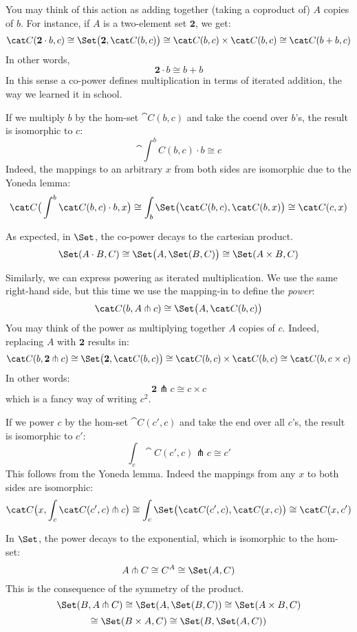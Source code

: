 \documentclass[DaoFP]{subfiles}
\begin{document}
You may think of this action as adding together (taking a coproduct of) $A$ copies of $b$. For instance, if $A$ is a two-element set $\mathbf 2$, we get:
\[ \cat C (\mathbf 2 \cdot b, c) \cong \Set \big( \mathbf 2, \cat C (b, c)\big) \cong \cat C(b, c) \times \cat C(b, c) \cong \cat C(b + b, c) \]
In other words, 
\[ \mathbf 2 \cdot b \cong b + b \]
In this sense a co-power defines multiplication in terms of iterated addition, the way we learned it in school. 

If we multiply $b$ by the hom-set $\cat C (b, c)$ and take the coend over $b$'s, the result is isomorphic to $c$:
\[ \cat \int^b C(b, c) \cdot b \cong c \]
Indeed, the mappings to an arbitrary $x$ from both sides are isomorphic due to the Yoneda lemma:
\[ \cat C \big( \int^b \cat C(b, c) \cdot b, x\big) \cong \int_b \Set \big( \cat C(b, c), \cat C (b, x)\big) \cong \cat C (c, x)\]



As expected, in $\Set$, the co-power decays to the cartesian product.
\[ \Set (A \cdot B, C) \cong \Set \big( A, \Set(B, C)\big) \cong \Set (A \times B, C) \]

Similarly, we can express powering as iterated multiplication. We use the same right-hand side, but this time we use the mapping-in to define the \emph{power}:
\[ \cat C (b, A \pitchfork c) \cong \Set  \big(A, \cat C(b, c)\big) \]
You may think of the power as multiplying together $A$ copies of $c$. Indeed, replacing $A$ with $\mathbf 2$ results in:
\[ \cat C (b, \mathbf 2 \pitchfork c) \cong \Set  \big(\mathbf 2, \cat C(b, c)\big) \cong \cat C(b, c) \times \cat C(b, c) \cong \cat C (b, c \times c)\]
In other words:
\[ \mathbf 2 \pitchfork c \cong c \times c \]
which is a fancy way of writing $c^2$.

If we power $c$ by the hom-set $\cat C(c', c)$ and take the end over all $c$'s, the result is isomorphic to $c'$:
\[ \int_c \cat C (c', c) \pitchfork c \cong c' \]
This follows from the Yoneda lemma. Indeed the mappings from any $x$ to both sides are isomorphic:
\[ \cat C \big(x, \int_c \cat C (c', c) \pitchfork c\big) \cong \int_c \Set \big( \cat C(c', c), \cat C(x, c)\big)  \cong \cat C (x, c') \]


In $\Set$, the power decays to the exponential, which is isomorphic to the hom-set:
\[ A \pitchfork C \cong C^A \cong \Set (A, C) \]
This is the consequence of the symmetry of the product.
\[ \Set(B, A \pitchfork C) \cong \Set (A, \Set(B, C)) \cong \Set (A \times B, C) \]
\[ \cong \Set (B \times A, C) \cong \Set (B, \Set (A, C))\]
\end{document}
